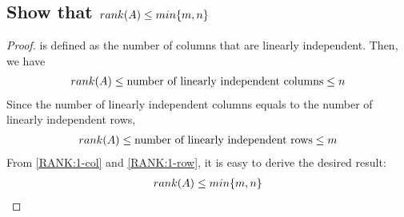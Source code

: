 \documentclass[11pt,a4paper]{report}
\begin{document}
\subsection{Show that $rank(A) \leq min\{m, n\}$}
\begin{proof}
 is defined as the number of columns that are linearly
independent. Then, we have 
\begin{align}  \label{RANK:1-col}
    rank(A) \leq \text{number of linearly independent columns} \leq n
\end{align}
Since the number of linearly independent columns equals to the
number of linearly independent rows, 
\begin{align} \label{RANK:1-row}
    rank(A) \leq \text{number of linearly independent rows} \leq m
\end{align}
From \eqref{RANK:1-col} and \eqref{RANK:1-row}, it is easy to derive the
desired result:
\begin{align} \label{RANK:1-result}
    rank(A) \leq  min\{m, n\}
\end{align}
\end{proof}
\end{document}
